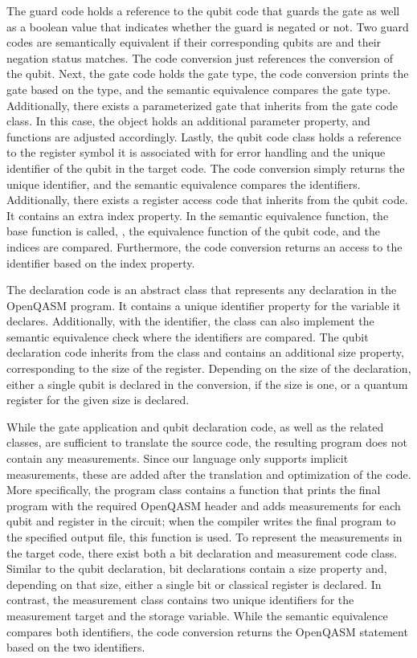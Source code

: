 The guard code holds a reference to the qubit code that guards the gate as well as a boolean value that indicates whether the guard is negated or not. Two guard codes are semantically equivalent if their corresponding qubits are and their negation status matches. The code conversion just references the conversion of the qubit.
Next, the gate code holds the gate type, the code conversion prints the gate based on the type, and the semantic equivalence compares the gate type. Additionally, there exists a parameterized gate that inherits from the gate code class. In this case, the object holds an additional parameter property, and functions are adjusted accordingly. Lastly, the qubit code class holds a reference to the register symbol it is associated with for error handling and the unique identifier of the qubit in the target code. The code conversion simply returns the unique identifier, and the semantic equivalence compares the identifiers. Additionally, there exists a register access code that inherits from the qubit code. It contains an extra index property. In the semantic equivalence function, the base function is called, \ie, the equivalence function of the qubit code, and the indices are compared. Furthermore, the code conversion returns an access to the identifier based on the index property.

The declaration code is an abstract class that represents any declaration in the OpenQASM program. It contains a unique identifier property for the variable it declares. Additionally, with the identifier, the class can also implement the semantic equivalence check where the identifiers are compared. The qubit declaration code inherits from the class and contains an additional size property, corresponding to the size of the register. Depending on the size of the declaration, either a single qubit is declared in the conversion, if the size is one, or a quantum register for the given size is declared.

While the gate application and qubit declaration code, as well as the related classes, are sufficient to translate the source code, the resulting program does not contain any measurements. Since our language only supports implicit measurements, these are added after the translation and optimization of the code. More specifically, the program class contains a function that prints the final program with the required OpenQASM header and adds measurements for each qubit and register in the circuit; when the compiler writes the final program to the specified output file, this function is used.
To represent the measurements in the target code, there exist both a bit declaration and measurement code class. Similar to the qubit declaration, bit declarations contain a size property and, depending on that size, either a single bit or classical register is declared. In contrast, the measurement class contains two unique identifiers for the measurement target and the storage variable. While the semantic equivalence compares both identifiers, the code conversion returns the OpenQASM statement based on the two identifiers.

